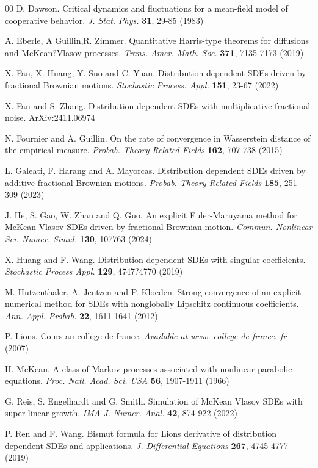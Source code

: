 \documentclass[12pt]{article}
\numberwithin{equation}{section}
\begin{document}
\begin{thebibliography}{00}
	 D. Dawson. Critical dynamics and fluctuations for a mean-field model of cooperative behavior. {\it J. Stat. Phys.} {\bf 31}, 29-85 (1983)
	
	 A. Eberle, A Guillin,R. Zimmer. Quantitative Harris-type theorems for diffusions and McKean?Vlasov processes. {\it Trans. Amer. Math. Soc.} {\bf 371}, 7135-7173 (2019)
	
	 X. Fan, X. Huang, Y. Suo and C. Yuan. Distribution dependent SDEs driven by fractional Brownian motions. {\it Stochastic Process. Appl.} {\bf 151}, 23-67 (2022)
	
	 X. Fan and S. Zhang. Distribution dependent SDEs with multiplicative fractional noise.  ArXiv:2411.06974
	
	 { N. Fournier and A. Guillin. On the rate of convergence in Wasserstein distance of the empirical measure. {\it Probab. Theory Related Fields} {\bf 162}, 707-738 (2015)}
	
	L. Galeati, F. Harang and A. Mayorcas. Distribution dependent SDEs driven by additive fractional Brownian motions. \textit{Probab. Theory Related Fields} \textbf{185}, 251-309 (2023)
	
	 J. He, S. Gao, W. Zhan and Q. Guo. An explicit Euler-Maruyama method for McKean-Vlasov SDEs driven by fractional Brownian motion. {\it Commun. Nonlinear Sci. Numer. Simul.} {\bf 130}, 107763 (2024)
	
	 X. Huang and F. Wang. Distribution dependent SDEs with singular coefficients. {\it Stochastic Process Appl.} {\bf 129}, 4747?4770 (2019)
	
	 M. Hutzenthaler, A. Jentzen and P. Kloeden. Strong convergence of an explicit numerical method for SDEs with nonglobally Lipschitz continuous coefficients. {\it Ann. Appl. Probab.} {\bf 22}, 1611-1641 (2012)
	
	P. Lions. Cours au college de france. {\it Available at www. college-de-france. fr} (2007)
	
	H. McKean. A class of Markov processes associated with nonlinear parabolic equations. \textit{Proc. Natl. Acad. Sci. USA} \textbf{56}, 1907-1911 (1966)
	
	 G. Reis, S. Engelhardt and G. Smith. Simulation of McKean Vlasov SDEs with super linear growth. {\it IMA J. Numer. Anal.} {\bf 42}, 874-922 (2022)
	
	 P. Ren and F. Wang. Bismut formula for Lions derivative of distribution dependent SDEs and applications. {\it J. Differential Equations} {\bf 267}, 4745-4777 (2019)
	

\end{thebibliography}
\end{document}
